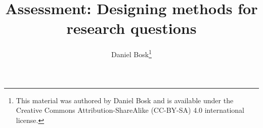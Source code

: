 \documentclass{article}
\begin{document}
\title{%
  Assessment:
  Designing methods for research questions
}
\author{Daniel Bosk\thanks{%
    This material was authored by Daniel Bosk and is available under the 
    Creative Commons Attribution-ShareAlike (CC-BY-SA) 4.0 international 
    license.
}}

\maketitle

\begin{abstract}
  
\end{abstract}

\clearpage



\printbibliography
\end{document}
